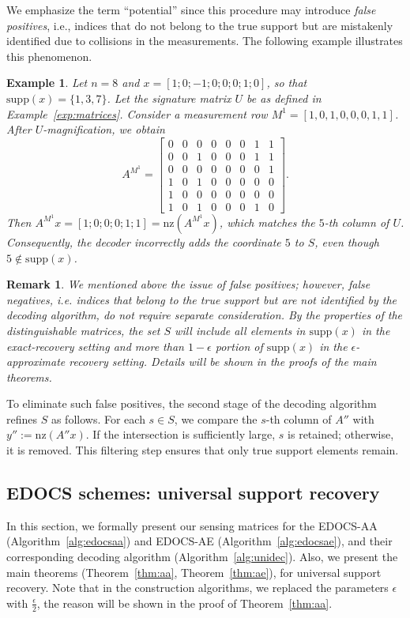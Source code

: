 \documentclass{article}
\newtheorem{example}{Example}[subsection]
\newtheorem{remark}{Remark}[subsection]
\newcommand{\supp}{\mathrm{supp}}
\newcommand{\nz}{\mathrm{nz}}
\begin{document}
We emphasize the term ``potential'' since this procedure may introduce \emph{false positives}, i.e., indices that do not belong to the true support but are mistakenly identified due to collisions in the measurements. The following example illustrates this phenomenon.

\begin{example}\label{exp:FP}
Let $n=8$ and $x=[1;0;-1;0;0;0;1;0]$, so that $\supp(x)=\{1,3,7\}$. Let the signature matrix $U$ be as defined in Example~\ref{exp:matrices}. Consider a measurement row $M^1=[1,0,1,0,0,0,1,1]$. After $U$-magnification, we obtain
\[
A^{M^1}=
\begin{bmatrix}
0 & 0 & 0 & 0 & 0 & 0 & 1 & 1 \\
0 & 0 & 1 & 0 & 0 & 0 & 1 & 1 \\
0 & 0 & 0 & 0 & 0 & 0 & 0 & 1 \\
1 & 0 & 1 & 0 & 0 & 0 & 0 & 0 \\
1 & 0 & 0 & 0 & 0 & 0 & 0 & 0 \\
1 & 0 & 1 & 0 & 0 & 0 & 1 & 0 
\end{bmatrix}.
\]
Then $A^{M^1}x=[1;0;0;0;1;1]=\nz(A^{M^1}x)$, which matches the $5$-th column of $U$. Consequently, the decoder incorrectly adds the coordinate $5$ to $S$, even though $5\notin \supp(x)$. 
\end{example}

\begin{remark}
    We mentioned above the issue of false positives; however, false negatives, i.e. indices that belong to the true support but are not identified by the decoding algorithm, do not require separate consideration. By the properties of the distinguishable matrices, the set $S$ will include all elements in $\supp(x)$ in the exact-recovery setting and more than $1-\epsilon$ portion of $\supp(x)$ in the $\epsilon$-approximate recovery setting. Details will be shown in the proofs of the main theorems. 
\end{remark}

To eliminate such false positives, the second stage of the decoding algorithm refines $S$ as follows. For each $s\in S$, we compare the $s$-th column of $A''$ with $y'':=\nz(A''x)$. If the intersection is sufficiently large, $s$ is retained; otherwise, it is removed. This filtering step ensures that only true support elements remain.

\subsection{EDOCS schemes: universal support recovery}\label{sec:usrAlgorithms}
In this section, we formally present our sensing matrices for the EDOCS-AA (Algorithm~\ref{alg:edocsaa}) and EDOCS-AE (Algorithm~\ref{alg:edocsae}), and their corresponding decoding algorithm (Algorithm~\ref{alg:unidec}). Also, we present the main theorems (Theorem~\ref{thm:aa}, Theorem~\ref{thm:ae}), for universal support recovery. Note that in the construction algorithms, we replaced the parameters $\epsilon$ with $\frac{\epsilon}{2}$, the reason will be shown in the proof of Theorem~\ref{thm:aa}.
 
\end{document}
